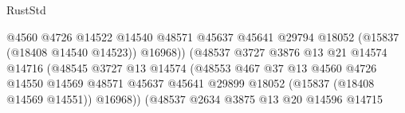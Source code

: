 \begin{lexlean}{RustStd}
\begin{coremodule}
{\begin{coremodule}
{{{{{{{{{{{{{{{{{{{{{{{{{{{{{{{{{{{{{{{{{{{{{{{{{{{{{{{{{{{{                                                    @4560
                                                    @4726
                                                    @14522
                                                    @14540
                                                    @48571
                                                    @45637
                                                    @45641
                                                    @29794
                                                    @18052
                                                    (@15837 (@18408 @14540 @14523))
                                                    @16968))
                                                (@48537
                                                  @3727
                                                  @3876
                                                  @13
                                                  @21
                                                  @14574
                                                  @14716
                                                  (@48545
                                                    @3727
                                                    @13
                                                    @14574
                                                    (@48553
                                                      @467
                                                      @37
                                                      @13
                                                      @4560
                                                      @4726
                                                      @14550
                                                      @14569
                                                      @48571
                                                      @45637
                                                      @45641
                                                      @29899
                                                      @18052
                                                      (@15837 (@18408 @14569 @14551))
                                                      @16968))
                                                  (@48537
                                                    @2634
                                                    @3875
                                                    @13
                                                    @20
                                                    @14596
                                                    @14715
}}}}}}}}}}}}}}}}}}}}}}}}}}}}}}}}}}}}}}}}}}}}}}}}}}}}}}}}}}}}
\end{coremodule}}
\end{coremodule}
\end{lexlean}
